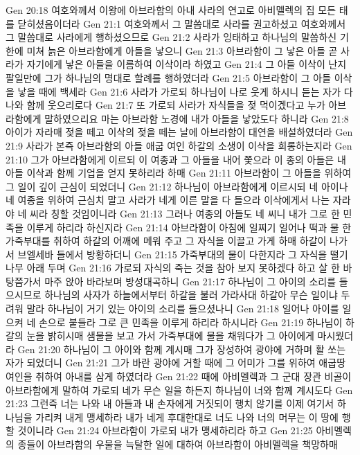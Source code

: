 Gen 20:18  여호와께서 이왕에 아브라함의 아내 사라의 연고로 아비멜렉의 집 모든 태를 닫히셨음이더라
Gen 21:1  여호와께서 그 말씀대로 사라를 권고하셨고 여호와께서 그 말씀대로 사라에게 행하셨으므로
Gen 21:2  사라가 잉태하고 하나님의 말씀하신 기한에 미쳐 늙은 아브라함에게 아들을 낳으니
Gen 21:3  아브라함이 그 낳은 아들 곧 사라가 자기에게 낳은 아들을 이름하여 이삭이라 하였고
Gen 21:4  그 아들 이삭이 난지 팔일만에 그가 하나님의 명대로 할례를 행하였더라
Gen 21:5  아브라함이 그 아들 이삭을 낳을 때에 백세라
Gen 21:6  사라가 가로되 하나님이 나로 웃게 하시니 듣는 자가 다 나와 함께 웃으리로다
Gen 21:7  또 가로되 사라가 자식들을 젖 먹이겠다고 누가 아브라함에게 말하였으리요 마는 아브라함 노경에 내가 아들을 낳았도다 하니라
Gen 21:8  아이가 자라매 젖을 떼고 이삭의 젖을 떼는 날에 아브라함이 대연을 배설하였더라
Gen 21:9  사라가 본즉 아브라함의 아들 애굽 여인 하갈의 소생이 이삭을 희롱하는지라
Gen 21:10  그가 아브라함에게 이르되 이 여종과 그 아들을 내어 쫓으라 이 종의 아들은 내 아들 이삭과 함께 기업을 얻지 못하리라 하매
Gen 21:11  아브라함이 그 아들을 위하여 그 일이 깊이 근심이 되었더니
Gen 21:12  하나님이 아브라함에게 이르시되 네 아이나 네 여종을 위하여 근심치 말고 사라가 네게 이른 말을 다 들으라 이삭에게서 나는 자라야 네 씨라 칭할 것임이니라
Gen 21:13  그러나 여종의 아들도 네 씨니 내가 그로 한 민족을 이루게 하리라 하신지라
Gen 21:14  아브라함이 아침에 일찌기 일어나 떡과 물 한 가죽부대를 취하여 하갈의 어깨에 메워 주고 그 자식을 이끌고 가게 하매 하갈이 나가서 브엘세바 들에서 방황하더니
Gen 21:15  가죽부대의 물이 다한지라 그 자식을 떨기나무 아래 두며
Gen 21:16  가로되 자식의 죽는 것을 참아 보지 못하겠다 하고 살 한 바탕쯤가서 마주 앉아 바라보며 방성대곡하니
Gen 21:17  하나님이 그 아이의 소리를 들으시므로 하나님의 사자가 하늘에서부터 하갈을 불러 가라사대 하갈아 무슨 일이냐 두려워 말라 하나님이 거기 있는 아이의 소리를 들으셨나니
Gen 21:18  일어나 아이를 일으켜 네 손으로 붙들라 그로 큰 민족을 이루게 하리라 하시니라
Gen 21:19  하나님이 하갈의 눈을 밝히시매 샘물을 보고 가서 가죽부대에 물을 채워다가 그 아이에게 마시웠더라
Gen 21:20  하나님이 그 아이와 함께 계시매 그가 장성하여 광야에 거하며 활 쏘는 자가 되었더니
Gen 21:21  그가 바란 광야에 거할 때에 그 어미가 그를 위하여 애굽땅 여인을 취하여 아내를 삼게 하였더라
Gen 21:22  때에 아비멜렉과 그 군대 장관 비골이 아브라함에게 말하여 가로되 네가 무슨 일을 하든지 하나님이 너와 함께 계시도다
Gen 21:23  그런즉 너는 나와 내 아들과 내 손자에게 거짓되이 행치 않기를 이제 여기서 하나님을 가리켜 내게 맹세하라 내가 네게 후대한대로 너도 나와 너의 머무는 이 땅에 행할 것이니라
Gen 21:24  아브라함이 가로되 내가 맹세하리라 하고
Gen 21:25  아비멜렉의 종들이 아브라함의 우물을 늑탈한 일에 대하여 아브라함이 아비멜렉을 책망하매
